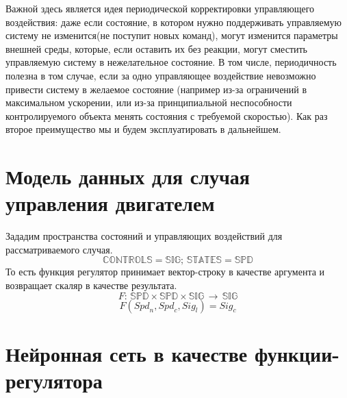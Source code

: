 \documentclass[14pt]{extreport}
\begin{document}
            Важной здесь является идея периодической корректировки управляющего воздействия: даже если состояние, в котором нужно поддерживать управляемую систему не изменится(не поступит новых команд), могут изменится параметры внешней среды, которые, если оставить их без реакции, могут сместить управляемую систему в нежелательное состояние. В том числе, периодичность полезна в том случае, если за одно управляющее воздействие невозможно привести систему в желаемое состояние (например из-за ограничений в максимальном ускорении, или из-за принципиальной неспособности контролируемого объекта менять состояния с требуемой скоростью). Как раз второе преимущество мы и будем эксплуатировать в дальнейшем.
        \section{Модель данных для случая управления двигателем}
            Зададим пространства состояний и управляющих воздействий для рассматриваемого случая.
            \[\mathbb{CONTROLS} = \mathbb{SIG};\, \mathbb{STATES} = \mathbb{SPD}\]
            То есть функция регулятор принимает вектор-строку в качестве аргумента и возвращает скаляр в качестве результата.
            \[F:\,\mathbb{SPD}\times\mathbb{SPD}\times\mathbb{SIG}\,\rightarrow\,\mathbb{SIG}\]
            \[F({Spd}_n,{Spd}_c,{Sig}_l) = {Sig}_c\]
        \section{Нейронная сеть в качестве функции-регулятора}
\end{document}
